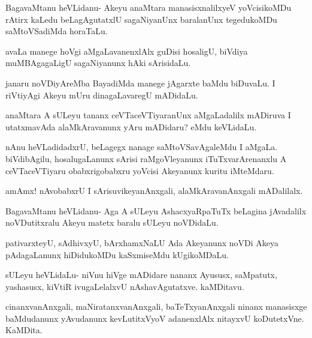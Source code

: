 \documentclass{article}
\begin{document}
\begin{mng}%
BagavaMtanu heVLidanu- Akeyu anaMtara manasisxnalilxyeV
yoVcisikoMDu rAtirx kaLedu beLagAgutatxlU sagaNiyanUnx baralanUnx tegedukoMDu
saMtoVSadiMda horaTaLu.
\end{mng}

\begin{mng}%
avaLa manege hoVgi aMgaLavanenxlAlx guDisi hosaligU, biVdiya muMBAgagaLigU sagaNiyanunx hAki sArisidaLu.
\end{mng}

\begin{mng}%
janaru noVDiyAreMba BayadiMda manege jAgarxte baMdu biDuvaLu.
I riVtiyAgi Akeyu mUru dinagaLavaregU mADidaLu.
\end{mng}

\begin{mng}%
anaMtara A sULeyu tananx ceVTaceVTiyaranUnx aMgaLadalilx
mADiruva I utatxmavAda alaMkAravanunx yAru mADidaru? eMdu
keVLidaLu.
\end{mng}

\begin{mng}%
nAnu heVLadidadxrU, beLagegx nanage saMtoVSavAgaleMdu I
aMgaLa. biVdibAgilu, hosalugaLanunx sArisi raMgoVleyanunx iTuTxvarArenanxlu
A ceVTaceVTiyaru obabxrigobabxru yoVcisi Akeyanunx kuritu
iMteMdaru.
\end{mng}

\begin{mng}%
amAmx! nAvobabxrU I sArisuvikeyanAnxgali, alaMkAravanAnxgali
mADalilalx.
\end{mng}

\begin{mng}%
BagavaMtanu heVLidanu- Aga A sULeyu AshacxyaRpaTuTx beLagina jAvadalilx
noVDutitxralu Akeyu matetx baralu sULeyu noVDidaLu.
\end{mng}

\begin{mng}%
pativarxteyU, sAdhivxyU, bArxhamxNaLU Ada Akeyanunx
noVDi Akeya pAdagaLanunx hiDidukoMDu kaSxmiseMdu kUgikoMDaLu.
\end{mng}

\begin{mng}%
sULeyu heVLidaLu- niVnu hiVge mADidare nananx Ayususx,
saMpatutx, yashasusx, kiVtiR ivugaLelalxvU nAshavAgutatxve. kaMDitavu.
\end{mng}

\begin{mng}%
cinanxvanAnxgali, maNiratanxvanAnxgali, baTeTxyanAnxgali ninanx
manasisxge baMdudanunx yAvudanunx kevLutitxVyoV adanenxlAlx nitayxvU
koDutetxVne. KaMDita.
\end{mng}
\end{document}
